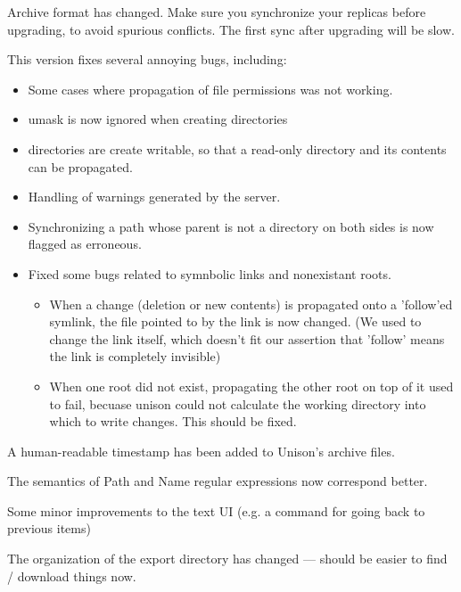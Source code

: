 \begin{changesfromversion}{1.219}
\item \incompatible{} Archive format has changed.  Make sure you
synchronize your replicas before upgrading, to avoid spurious
conflicts.  The first sync after upgrading will be slow.

\item This version fixes several annoying bugs, including:
\begin{itemize}
\item Some cases where propagation of file permissions was not
working.
\item umask is now ignored when creating directories
\item directories are create writable, so that a read-only directory and
    its contents can be propagated.
\item Handling of warnings generated by the server.
\item Synchronizing a path whose parent is not a directory on both sides is
now flagged as erroneous.
\item Fixed some bugs related to symnbolic links and nonexistant roots.
\begin{itemize}
\item
   When a change (deletion or new contents) is propagated onto a
     'follow'ed symlink, the file pointed to by the link is now changed.
     (We used to change the link itself, which doesn't fit our assertion
     that 'follow' means the link is completely invisible)
   \item When one root did not exist, propagating the other root on top of it
     used to fail, becuase unison could not calculate the working directory
     into which to write changes.  This should be fixed.
\end{itemize}
\end{itemize}

\item A human-readable timestamp has been added to Unison's archive files.

\item The semantics of Path and Name regular expressions now
correspond better.

\item Some minor improvements to the text UI (e.g. a command for going
back to previous items)

\item The organization of the export directory has changed --- should
be easier to find / download things now.
\end{changesfromversion}

